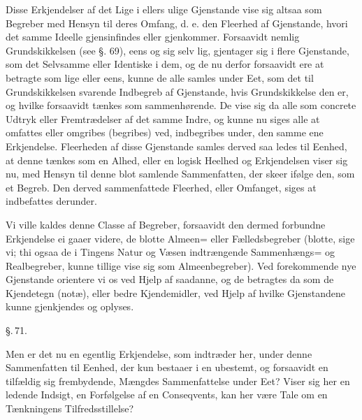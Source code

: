 \documentclass[12pt]{book}
\makeatletter
\def\textit#1{#1}%
\def\emph#1{#1}%
\newcommand{\umph}[2][misc]{%
  \@ifundefined{umph@#1@on}{#2}{\emph{#2}}}
\newcommand{\parag}[1]{%
  \par\vspace{0.9\baselineskip}%
  {\centering\textit{\S.\,#1.}\par}%
  \vspace{0.35\baselineskip}%
  \noindent\hspace{\parindent}\ignorespaces
}
\newcommand{\opage}[1]{\marginnote{\footnotesize\textit{[#1]}}}
\makeatother
\begin{document}
Disse Erkjendelser af det Lige i ellers ulige Gjenstande vise sig altsaa som
Begreber med Hensyn til deres Omfang, d. e. den Fleerhed af Gjenstande, hvori det
samme Ideelle gjensinfindes eller gjenkommer.
Forsaavidt nemlig Grundskikkelsen (see §. 69), eens og sig selv lig, gjentager sig i
flere Gjenstande, som det Selvsamme eller Identiske i dem, og de nu derfor
forsaavidt ere at betragte som lige eller eens, kunne de alle samles under Eet, som
det til Grundskikkelsen svarende Indbegreb af Gjenstande, hvis Grundskikkelse den
er, og hvilke forsaavidt tænkes som sammenhørende. De vise sig da alle som concrete
Udtryk eller Fremtrædelser af det samme Indre, og kunne nu siges alle at omfattes
eller omgribes (begribes) ved, indbegribes under, den samme ene Erkjendelse.
Fleerheden af disse Gjenstande samles derved saa%
\opage{188}ledes til Eenhed, at denne tænkes som en Alhed, eller en \emph{logisk Heelhed} og
Erkjendelsen viser sig nu, med Hensyn til denne blot samlende Sammenfatten, der
skeer ifølge den, som et Begreb. Den derved sammenfattede Fleerhed, eller Omfanget,
siges at indbefattes derunder.

Vi ville kaldes denne Classe af Begreber, forsaavidt den dermed forbundne
Erkjendelse ei gaaer videre, de blotte \emph{Almeen= eller Fælledsbegreber} (blotte,
sige vi; thi ogsaa de i Tingens Natur og Væsen indtrængende Sammenhængs= og
Realbegreber, kunne tillige vise sig som Almeenbegreber). Ved forekommende nye
Gjenstande orientere vi os ved Hjelp af saadanne, og de betragtes da som de
\emph{Kjendetegn} (\textit{notæ}), eller bedre \emph{Kjendemidler}, ved Hjelp af
hvilke Gjenstandene kunne gjenkjendes og oplyses.

\parag{71}
Men er det nu en egentlig \umph[schwab]{intellectuel} Erkjendelse, som indtræder
her, under denne Sammenfatten til Eenhed, der kun bestaaer i en ubestemt, og
forsaavidt en tilfældig sig frembydende, Mængdes Sammenfattelse under Eet? Viser sig
her en ledende \emph{Indsigt}, en \emph{Forfølgelse} af en \emph{Conseqvents}, kan
her være Tale om en \emph{Tænkningens Tilfredsstillelse}?
\end{document}
